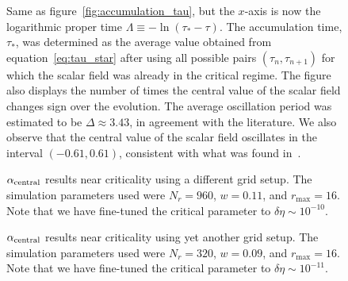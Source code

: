 \documentclass[a4paper,11pt]{article}
\renewcommand{\d}{\delta}
\newcommand{\D}{\Delta}
\newcommand{\lrpar}[1]{\left( #1 \right)}
\begin{document}
\begin{figure}[htt]
  \centering
  
  \caption[Central value of the scalar field, $\phi_{\rm central}$, near criticality as a function of logarithmic proper time, $\Lambda$.]{Same as figure~\ref{fig:accumulation_tau}, but the $x$-axis is now the logarithmic proper time $\Lambda\equiv-\ln\lrpar{\tau_{*}-\tau}$. The accumulation time, $\tau_{*}$, was determined as the average value obtained from equation~\eqref{eq:tau_star} after using all possible pairs $\lrpar{\tau_{n},\tau_{n+1}}$ for which the scalar field was already in the critical regime. The figure also displays the number of times the central value of the scalar field changes sign over the evolution. The average oscillation period was estimated to be $\D \approx 3.43$, in agreement with the literature. We also observe that the central value of the scalar field oscillates in the interval $\lrpar{-0.61,0.61}$, consistent with what was found in~\cite{PhysRevLett.70.9,PhysRevD.92.084037,Baumgarte_2018}.}
  \label{fig:accumulation_Lambda}
\end{figure}

\begin{figure}[H]
  \centering
  
  \caption[$\alpha_{\rm central}$ results near criticality using a different grid setup.]{$\alpha_{\rm central}$ results near criticality using a different grid setup. The simulation parameters used were $N_{r}=960$, $w=0.11$, and $r_{\max}=16$. Note that we have fine-tuned the critical parameter to $\d\eta\sim10^{-10}$.}
  \label{fig:critical_alpha}
\end{figure}

\begin{figure}[H]
  \centering
  
  \caption[$\alpha_{\rm central}$ results near criticality using yet another grid setup.]{$\alpha_{\rm central}$ results near criticality using yet another grid setup. The simulation parameters used were $N_{r}=320$, $w=0.09$, and $r_{\max}=16$. Note that we have fine-tuned the critical parameter to $\d\eta\sim10^{-11}$.}
  \label{fig:critical_alpha_new}
\end{figure}

\clearpage
{}
\printbibliography
\end{document}
